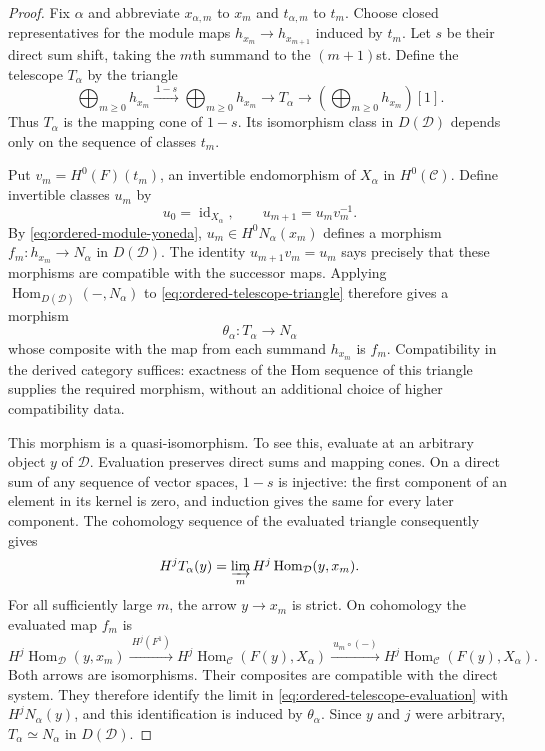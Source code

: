 \documentclass[11pt]{article}
\numberwithin{equation}{section}
\theoremstyle{definition}
\theoremstyle{remark}
\begin{document}
\begin{proof}
Fix $\alpha$ and abbreviate $x_{\alpha,m}$ to $x_m$ and
$t_{\alpha,m}$ to $t_m$.  Choose closed representatives for the module
maps $h_{x_m}\to h_{x_{m+1}}$ induced by $t_m$.  Let $s$ be their direct
sum shift, taking the $m$th summand to the $(m+1)$st.  Define the telescope
$T_\alpha$ by the triangle
\begin{equation}
 \bigoplus_{m\ge0}h_{x_m}
 \xrightarrow{\,1-s\,}
 \bigoplus_{m\ge0}h_{x_m}
 \longrightarrow T_\alpha
 \longrightarrow
 \left(\bigoplus_{m\ge0}h_{x_m}\right)[1].
 \label{eq:ordered-telescope-triangle}
\end{equation}
Thus $T_\alpha$ is the mapping cone of $1-s$.  Its isomorphism class in
$D(\mathcal D)$ depends only on the sequence of classes $t_m$.

Put $v_m=H^0(F)(t_m)$, an invertible endomorphism of $X_\alpha$ in
$H^0(\mathcal C)$.  Define invertible classes $u_m$ by
\[
 u_0=\operatorname{id}_{X_\alpha},\qquad u_{m+1}=u_m v_m^{-1}.
\]
By \eqref{eq:ordered-module-yoneda}, $u_m\in H^0N_\alpha(x_m)$ defines
a morphism $f_m:h_{x_m}\to N_\alpha$ in $D(\mathcal D)$.  The identity
$u_{m+1}v_m=u_m$ says precisely that these morphisms are compatible with
the successor maps.  Applying $\operatorname{Hom}_{D(\mathcal D)}(-,N_\alpha)$ to
\eqref{eq:ordered-telescope-triangle} therefore gives a morphism
\[
 \theta_\alpha:T_\alpha\longrightarrow N_\alpha
\]
whose composite with the map from each summand $h_{x_m}$ is $f_m$.
Compatibility in the derived category suffices: exactness of the Hom
sequence of this triangle supplies the required morphism, without an
additional choice of higher compatibility data.

This morphism is a quasi-isomorphism.  To see this, evaluate at an
arbitrary object $y$ of $\mathcal D$.  Evaluation preserves direct sums
and mapping cones.  On a direct sum of any sequence of vector spaces,
$1-s$ is injective: the first component of an element in its kernel is
zero, and induction gives the same for every later component.  The
cohomology sequence of the evaluated triangle consequently gives
\begin{equation}
 H^j T_\alpha(y)
 =\varinjlim_m H^j\operatorname{Hom}_{\mathcal D}(y,x_m).
 \label{eq:ordered-telescope-evaluation}
\end{equation}
For all sufficiently large $m$, the arrow $y\to x_m$ is strict.  On
cohomology the evaluated map $f_m$ is
\[
 H^j\operatorname{Hom}_{\mathcal D}(y,x_m)
 \xrightarrow{\ H^j(F^1)\ }
 H^j\operatorname{Hom}_{\mathcal C}(F(y),X_\alpha)
 \xrightarrow{\ u_m\circ(-)\ }
 H^j\operatorname{Hom}_{\mathcal C}(F(y),X_\alpha).
\]
Both arrows are isomorphisms.  Their composites are compatible with
the direct system.  They therefore identify the limit in
\eqref{eq:ordered-telescope-evaluation} with $H^jN_\alpha(y)$, and this
identification is induced by $\theta_\alpha$.  Since $y$ and $j$ were
arbitrary, $T_\alpha\simeq N_\alpha$ in $D(\mathcal D)$.


\end{proof}
\end{document}
